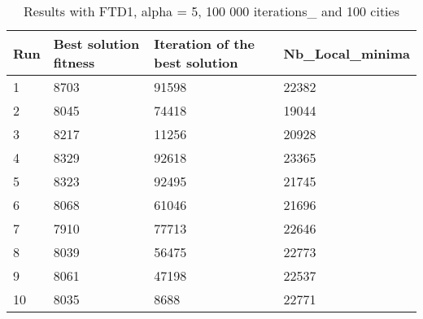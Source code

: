 \documentclass[12pt,oneside,a4paper]{article}
\begin{document}
\begin{table}[h]
  \centering
  \small
  \begin{tabular}{llll}
    \hline
    \multicolumn{1}{|l|}{\textbf{Run}}& \multicolumn{1}{l|}{\textbf{Best solution fitness}}& \multicolumn{1}{l|}{\textbf{Iteration of the best solution}}& \multicolumn{1}{l|}{\textbf{Nb\_Local\_minima}}\\ \hline
    \multicolumn{1}{|l|}{1} & \multicolumn{1}{l|}{8703}  & \multicolumn{1}{l|}{91598} & \multicolumn{1}{l|}{22382}  \\ \hline
    \multicolumn{1}{|l|}{2} & \multicolumn{1}{l|}{8045}  & \multicolumn{1}{l|}{74418} & \multicolumn{1}{l|}{19044}  \\ \hline
    \multicolumn{1}{|l|}{3} & \multicolumn{1}{l|}{8217}  & \multicolumn{1}{l|}{11256}  & \multicolumn{1}{l|}{20928}  \\ \hline
    \multicolumn{1}{|l|}{4} & \multicolumn{1}{l|}{8329}  & \multicolumn{1}{l|}{92618}  & \multicolumn{1}{l|}{23365}  \\ \hline
    \multicolumn{1}{|l|}{5} & \multicolumn{1}{l|}{8323}  & \multicolumn{1}{l|}{92495}  & \multicolumn{1}{l|}{21745}  \\ \hline
    \multicolumn{1}{|l|}{6} & \multicolumn{1}{l|}{8068}  & \multicolumn{1}{l|}{61046}  & \multicolumn{1}{l|}{21696}  \\ \hline
    \multicolumn{1}{|l|}{7} & \multicolumn{1}{l|}{7910}  & \multicolumn{1}{l|}{77713}  & \multicolumn{1}{l|}{22646}  \\ \hline
    \multicolumn{1}{|l|}{8} & \multicolumn{1}{l|}{8039}  & \multicolumn{1}{l|}{56475} & \multicolumn{1}{l|}{22773}  \\ \hline
    \multicolumn{1}{|l|}{9} & \multicolumn{1}{l|}{8061}  & \multicolumn{1}{l|}{47198} & \multicolumn{1}{l|}{22537}  \\ \hline
    \multicolumn{1}{|l|}{10} & \multicolumn{1}{l|}{8035}  & \multicolumn{1}{l|}{8688} & \multicolumn{1}{l|}{22771}  \\ \hline
  \end{tabular}
  \caption{Results with FTD1, alpha = 5, 100 000 iterations\_ and 100 cities}
\end{table}
\end{document}
